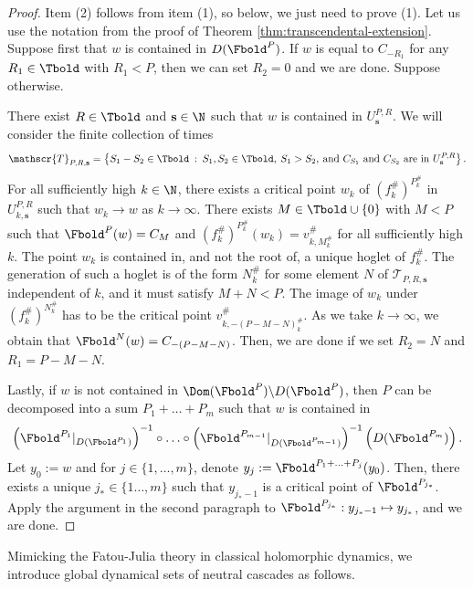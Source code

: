 \documentclass{amsart}
\begin{document}
\begin{proof}
    Item (2) follows from item (1), so below, we just need to prove (1).
    Let us use the notation from the proof of Theorem \ref{thm:transcendental-extension}.
    Suppose first that $w$ is contained in $D(\Fbold^P)$.
    If $w$ is equal to $C_{-R_1}$ for any $R_1 \in \Tbold$ with $R_1< P$, then we can set $R_2=0$ and we are done. 
    Suppose otherwise.
    
    There exist $R \in \Tbold$ and $\mathbf{s} \in \N$ such that $w$ is contained in $U_{\mathbf{s}}^{P,R}$.
    We will consider the finite collection of times
    \[
        \mathscr{T}_{P,R,\mathbf{s}} = 
        \left\{ 
        S_1-S_2 \in \Tbold \: : \: S_1, S_2 \in \Tbold, \: S_1>S_2, \: \text{and } C_{S_1} \textnormal{ and } C_{S_2} \text{ are in } U_{\mathbf{s}}^{P,R} 
        \right\}. 
    \]
    For all sufficiently high $k \in \N$, there exists a critical point $w_k$ of $(f_k^{\#})^{P_k^{\#}}$ in $U_{k,\mathbf{s}}^{P,R}$ such that $w_k \to w$ as $k \to \infty$.
    There exists $M \in \Tbold \cup \{0\}$ with $M < P$ such that $\Fbold^P(w) = C_M$ and 
    $(f_k^{\#})^{P_k^{\#}}(w_k) = v^{\#}_{k,M_k^{\#}}$ 
    for all sufficiently high $k$.
    The point $w_k$ is contained in, and not the root of, a unique hoglet of $f_k^{\#}$. 
    The generation of such a hoglet is of the form $N_k^{\#}$ for some element $N$ of $\mathscr{T}_{P,R,\mathbf{s}}$ independent of $k$, and it must satisfy $M+N<P$.
    The image of $w_k$ under $(f_k^{\#})^{N_k^{\#}}$ has to be the critical point $v^{\#}_{k,-(P-M-N)_k^{\#}}$. 
    As we take $k \to \infty$, we obtain that $\Fbold^{N}(w) = C_{-(P-M-N)}$.
    Then, we are done if we set $R_2 = N$ and $R_1 = P-M-N$.

    Lastly, if $w$ is not contained in $\Dom(\Fbold^P) \backslash D(\Fbold^P)$, then $P$ can be decomposed into a sum $P_1+\ldots + P_m$ such that $w$ is contained in 
    \[
        \left(\Fbold^{P_1}|_{D(\Fbold^{P_1})}\right)^{-1}  \circ \ldots \circ  \left( \Fbold^{P_{m-1}}|_{D(\Fbold^{P_{m-1}})} \right)^{-1} 
        \left( D(\Fbold^{P_m}) \right).
    \]
    Let $y_0 := w$ and for $j \in \{1,\ldots, m\}$, denote $y_j := \Fbold^{P_1+\ldots+P_j}(y_0)$.
    Then, there exists a unique $j_* \in \{1\ldots,m\}$ such that $y_{j_*-1}$ is a critical point of $\Fbold^{P_{j_*}}$.
    Apply the argument in the second paragraph to $\Fbold^{P_{j_*}}: y_{j_*-1} \mapsto y_{j_*}$, and we are done.
\end{proof}

Mimicking the Fatou-Julia theory in classical holomorphic dynamics, we introduce global dynamical sets of neutral cascades as follows.
\end{document}
